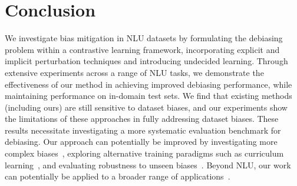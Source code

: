 \section{Conclusion}
We investigate bias mitigation in NLU datasets by 
formulating the debiasing problem within a contrastive learning framework, incorporating explicit and implicit perturbation techniques and introducing undecided learning. Through extensive experiments across a range of NLU tasks, we demonstrate the effectiveness of our method in achieving improved debiasing performance, while maintaining performance on in-domain test sets. We find that existing methods (including ours) are still sensitive to dataset biases, and our experiments show the limitations of these approaches in fully addressing dataset biases. These results necessitate investigating a more systematic evaluation benchmark for debiasing. 
%
Our approach can potentially be improved by
investigating more complex biases~\citep{yao2023large,gandikota2023erasing}, 
exploring alternative training paradigms such as curriculum learning~\citep{bengio2009curriculum,vakil-amiri-2022-generic}, and evaluating robustness to unseen biases~\citep{NEURIPS2023_b0d9ceb3}. 
Beyond NLU, our work can potentially be applied to a broader range of applications~\citep{cheng2024mu,Liu_2024_WACV}.
